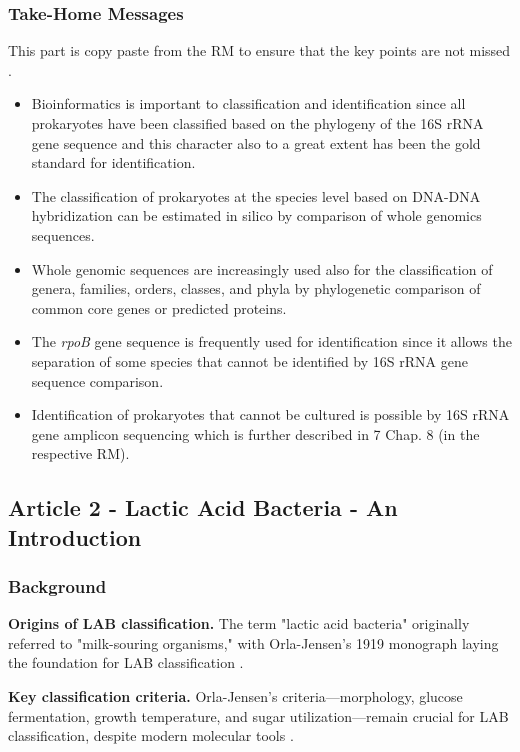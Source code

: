 \subsubsection*{Take-Home Messages}
This part is copy paste from the RM to ensure that the key points are not missed \cite*{L3-SeqBasedClass}.
\begin{highlight}
    \begin{itemize}
        \item Bioinformatics is important to classification and identification since all prokaryotes have been classified based on the phylogeny of the 16S rRNA gene sequence and this character also to a great extent has been the gold standard for identification.
        \item The classification of prokaryotes at the species level based on DNA-DNA hybridization can be estimated in silico by comparison of whole genomics sequences.
        \item Whole genomic sequences are increasingly used also for the classification of genera, families, orders, classes, and phyla by phylogenetic comparison of common core genes or predicted proteins.
        \item The \textit{rpoB} gene sequence is frequently used for identification since it allows the separation of some species that cannot be identified by 16S rRNA gene sequence comparison.
        \item Identification of prokaryotes that cannot be cultured is possible by 16S rRNA gene amplicon sequencing which is further described in 7 Chap. 8 (in the respective RM).
    \end{itemize}
\end{highlight}

\subsection{Article 2 - Lactic Acid Bacteria - An Introduction}
\subsubsection*{Background}
\textbf{Origins of LAB classification.} The term "lactic acid bacteria" originally referred to "milk-souring organisms," with Orla-Jensen's 1919 monograph laying the foundation for LAB classification \cite*{L3-LAB}.

\textbf{Key classification criteria.} Orla-Jensen's criteria—morphology, glucose fermentation, growth temperature, and sugar utilization—remain crucial for LAB classification, despite modern molecular tools \cite*{L3-LAB}.

